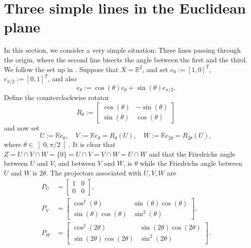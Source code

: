 \documentclass[11pt]{article}
\newcommand{\RR}{\ensuremath{\mathbb R}}
\theoremstyle{definition}
\providecommand{\RR}{\mathbb{R}}
\providecommand{\RR}{\mathbb{R}}
\begin{document}
{{\color{black}
\section{Three simple lines in the Euclidean plane}

\label{sec:3lines}

In this section, we consider a very simple situation:
Three lines passing through the origin, where the second line
bisects the angle between the first and the third.
We follow the set up in \cite[Section~5]{BBCNPW1}. 
Suppose that $X=\RR^2$, and 
set
$e_0 := [1,0]^T$, $e_{\pi/2} := [0,1]^T$, and also 
\begin{equation*}
e_\theta := \cos(\theta)e_0 + \sin(\theta)e_{\pi/2}.
\end{equation*}
Define the counterclockwise rotator
\begin{equation*}
R_\theta := 
\begin{bmatrix}
\cos(\theta) & -\sin(\theta)\\
\sin(\theta) & \cos(\theta)
\end{bmatrix}
\end{equation*}
and now set 
\begin{equation*}
U := \RR e_0, \quad 
V := \RR e_\theta = R_\theta(U), \quad
W := \RR e_{2\theta} = R_{2\theta}(U), 
\end{equation*}
where $\theta\in\left]0,\pi/2\right[$. 
It is clear that $Z=U\cap V\cap W = \{0\} = U\cap V=V\cap W=U\cap W$ 
and that the Friedrichs angle between $U$ and $V$, and between $V$ and $W$, is $\theta$ while the Friedrichs angle between $U$ and $W$ is $2\theta$. 
The projectors associated with $U,V,W$ are 
\begin{align*}
P_{U} &= 
\begin{bmatrix}
1 & 0\\
0 & 0 
\end{bmatrix},\\
P_{V} &= 
\begin{bmatrix}
\cos^2(\theta) & \sin(\theta)\cos(\theta)\\
\sin(\theta)\cos(\theta)& \sin^2(\theta)
\end{bmatrix},\\
P_{W} &= 
\begin{bmatrix}
\cos^2(2\theta) & \sin(2\theta)\cos(2\theta)\\
\sin(2\theta)\cos(2\theta)& \sin^2(2\theta)
\end{bmatrix}. 
\end{align*}

}}
\end{document}
